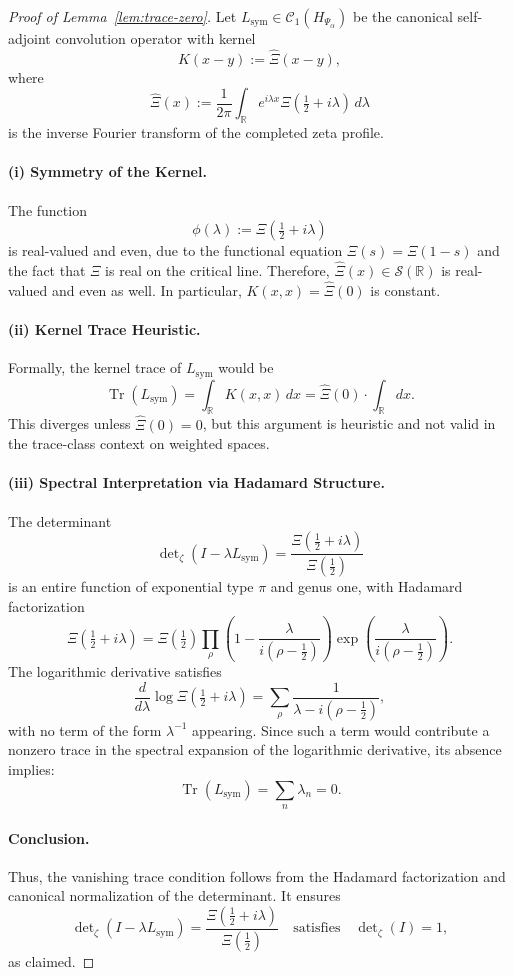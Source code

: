 \begin{proof}[Proof of Lemma~\ref{lem:trace-zero}]
Let \( L_{\mathrm{sym}} \in \mathcal{C}_1(H_{\Psi_\alpha}) \) be the canonical self-adjoint convolution operator with kernel
\[
K(x - y) := \widehat{\Xi}(x - y),
\]
where
\[
\widehat{\Xi}(x) := \frac{1}{2\pi} \int_{\mathbb{R}} e^{i\lambda x} \Xi\left( \tfrac{1}{2} + i\lambda \right) \, d\lambda
\]
is the inverse Fourier transform of the completed zeta profile.

\paragraph{(i) Symmetry of the Kernel.}
The function
\[
\phi(\lambda) := \Xi\left( \tfrac{1}{2} + i\lambda \right)
\]
is real-valued and even, due to the functional equation \( \Xi(s) = \Xi(1 - s) \) and the fact that \( \Xi \) is real on the critical line. Therefore, \( \widehat{\Xi}(x) \in \mathcal{S}(\mathbb{R}) \) is real-valued and even as well. In particular, \( K(x, x) = \widehat{\Xi}(0) \) is constant.

\paragraph{(ii) Kernel Trace Heuristic.}
Formally, the kernel trace of \( L_{\mathrm{sym}} \) would be
\[
\operatorname{Tr}(L_{\mathrm{sym}}) = \int_{\mathbb{R}} K(x, x)\, dx = \widehat{\Xi}(0) \cdot \int_{\mathbb{R}} dx.
\]
This diverges unless \( \widehat{\Xi}(0) = 0 \), but this argument is heuristic and not valid in the trace-class context on weighted spaces.

\paragraph{(iii) Spectral Interpretation via Hadamard Structure.}
The determinant
\[
\det\nolimits_\zeta(I - \lambda L_{\mathrm{sym}}) = \frac{\Xi\left( \tfrac{1}{2} + i\lambda \right)}{\Xi\left( \tfrac{1}{2} \right)}
\]
is an entire function of exponential type \( \pi \) and genus one, with Hadamard factorization
\[
\Xi\left( \tfrac{1}{2} + i\lambda \right)
= \Xi\left( \tfrac{1}{2} \right)
\prod_\rho \left(1 - \frac{\lambda}{i(\rho - \tfrac{1}{2})} \right)
\exp\left( \frac{\lambda}{i(\rho - \tfrac{1}{2})} \right).
\]
The logarithmic derivative satisfies
\[
\frac{d}{d\lambda} \log \Xi\left( \tfrac{1}{2} + i\lambda \right)
= \sum_\rho \frac{1}{\lambda - i(\rho - \tfrac{1}{2})},
\]
with no term of the form \( \lambda^{-1} \) appearing. Since such a term would contribute a nonzero trace in the spectral expansion of the logarithmic derivative, its absence implies:
\[
\operatorname{Tr}(L_{\mathrm{sym}}) = \sum_n \lambda_n = 0.
\]

\paragraph{Conclusion.}
Thus, the vanishing trace condition follows from the Hadamard factorization and canonical normalization of the determinant. It ensures
\[
\det\nolimits_\zeta(I - \lambda L_{\mathrm{sym}}) = \frac{\Xi\left( \tfrac{1}{2} + i\lambda \right)}{\Xi\left( \tfrac{1}{2} \right)}
\quad \text{satisfies} \quad \det\nolimits_\zeta(I) = 1,
\]
as claimed.
\end{proof}
% 